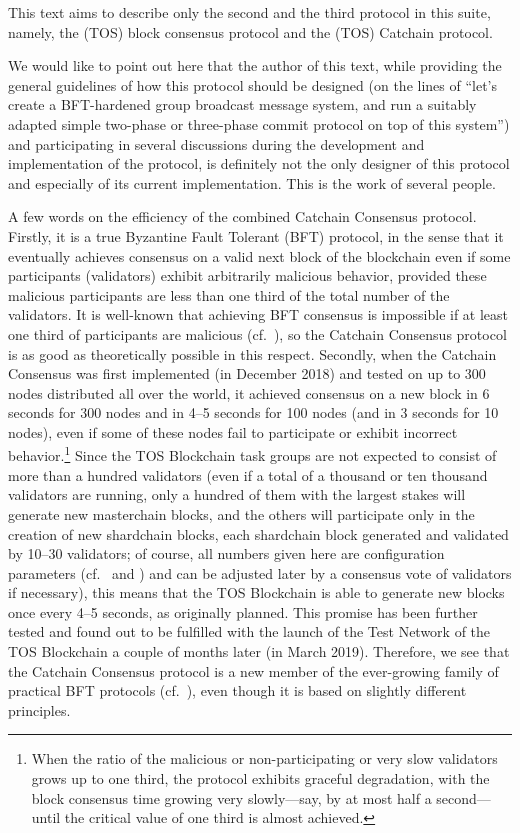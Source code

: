 \documentclass[12pt,oneside]{article}
\begin{document}
This text aims to describe only the second and the third protocol in this suite, namely, the (TOS) block consensus protocol and the (TOS) Catchain protocol.

We would like to point out here that the author of this text, while providing the general guidelines of how this protocol should be designed (on the lines of ``let's create a BFT-hardened group broadcast message system, and run a suitably adapted simple two-phase or three-phase commit protocol on top of this system'') and participating in several discussions during the development and implementation of the protocol, is definitely not the only designer of this protocol and especially of its current implementation. This is the work of several people.

A few words on the efficiency of the combined Catchain Consensus protocol. Firstly, it is a true Byzantine Fault Tolerant (BFT) protocol, in the sense that it eventually achieves consensus on a valid next block of the blockchain even if some participants (validators) exhibit arbitrarily malicious behavior, provided these malicious participants are less than one third of the total number of the validators. It is well-known that achieving BFT consensus is impossible if at least one third of participants are malicious (cf.~\cite{Byzantine}), so the Catchain Consensus protocol is as good as theoretically possible in this respect. Secondly, when the Catchain Consensus was first implemented (in December 2018) and tested on up to 300 nodes distributed all over the world, it achieved consensus on a new block in 6 seconds for 300 nodes and in 4--5 seconds for 100 nodes (and in 3 seconds for 10 nodes), even if some of these nodes fail to participate or exhibit incorrect behavior.\footnote{When the ratio of the malicious or non-participating or very slow validators grows up to one third, the protocol exhibits graceful degradation, with the block consensus time growing very slowly---say, by at most half a second---until the critical value of one third is almost achieved.} Since the TOS Blockchain task groups are not expected to consist of more than a hundred validators (even if a total of a thousand or ten thousand validators are running, only a hundred of them with the largest stakes will generate new masterchain blocks, and the others will participate only in the creation of new shardchain blocks, each shardchain block generated and validated by 10--30 validators; of course, all numbers given here are configuration parameters (cf.\ \cite{TOS} and \cite{TBC}) and can be adjusted later by a consensus vote of validators if necessary), this means that the TOS Blockchain is able to generate new blocks once every 4--5 seconds, as originally planned. This promise has been further tested and found out to be fulfilled with the launch of the Test Network of the TOS Blockchain a couple of months later (in March 2019). Therefore, we see that the Catchain Consensus protocol is a new member of the ever-growing family of practical BFT protocols (cf.~\cite{PBFT}), even though it is based on slightly different principles.
\end{document}
